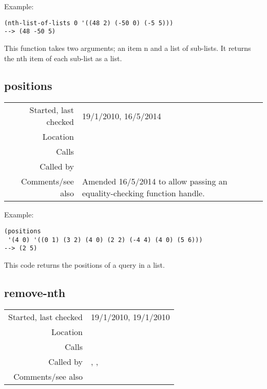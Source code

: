 \vspace{0.5cm}
\noindent Example:
\begin{verbatim}
(nth-list-of-lists 0 '((48 2) (-50 0) (-5 5)))
--> (48 -50 5)
\end{verbatim}

\noindent This function takes two arguments; an item n
and a list of sub-lists. It returns the nth item of
each sub-list as a list.


\subsection*{positions}\label{fun:positions}

\vspace{0.3cm}
\begin{tabular}{r|p{8cm}}
Started, last checked & 19/1/2010, 16/5/2014 \\
Location & \nameref{sec:list-processing} \\
Calls & \\
Called by & \\
Comments/see also & Amended 16/5/2014 to allow passing an equality-checking function handle.
\end{tabular}

\vspace{0.5cm}
\noindent Example:
\begin{verbatim}
(positions
 '(4 0) '((0 1) (3 2) (4 0) (2 2) (-4 4) (4 0) (5 6)))
--> (2 5)
\end{verbatim}

\noindent This code returns the positions of a query
in a list.


\subsection*{remove-nth}\label{fun:remove-nth}

\vspace{0.3cm}
\begin{tabular}{r|p{8cm}}
Started, last checked & 19/1/2010, 19/1/2010 \\
Location & \nameref{sec:list-processing} \\
Calls & \\
Called by & \nameref{fun:remove-nth-list}, \nameref{fun:sort-by-col-asc},\newline \nameref{fun:sort-by-col-desc} \\
Comments/see also &
\end{tabular}

